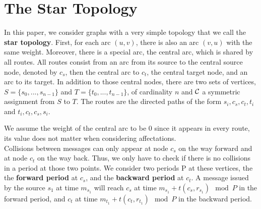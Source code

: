 \documentclass[a4paper,10pt]{article}
\begin{document}
\section{The Star Topology}
  
   
    
      In this paper, we consider graphs with a very simple topology that we call the {\bf star topology}. 
      First, for each arc $(u,v)$, there is also an arc $(v,u)$ with the same weight.
      Moreover, there is a special arc, the central arc, which is shared by all routes.
      All routes consist from an arc from its source to the central source node, denoted by {\bf $c_s$},
      then the central arc to {\bf $c_t$}, the central target node, and an arc to its target. In addition to those central nodes, there are two sets of vertices, $S=\{s_0,...,s_{n-1}\}$ and $T=\{t_0,...,t_{n-1}\}$, of cardinality $n$ and ${\cal C}$ a symmetric assignment from $S$ to $T$. 
      The routes are the directed paths of the form $s_i,c_s,c_t,t_i$ and $t_i,c_t,c_s,s_i$. 
      
      
       \begin{center}
	 

  \end{center}
	
      We assume the weight of the central arc to be $0$ since it appears in every route,
      its value does not matter when considering affectations.\\
      Collisions between messages can only appear at node $c_s$ on the way forward and at node $c_t$ on the way back.
      Thus, we only have to check if there is no collisions in a period at those two points.
      We consider two periods P at these vertices, the the {\bf forward period} at $c_s$, and the {\bf backward period} at $c_t$. A message issued by the source $s_1$ at time $m_{s_1}$ will reach $c_s$ at time $m_{s_1} + t(c_s,r_{s_1}) \mod P$ in the forward period, and  $c_t$ at time $m_{t_1} + t(c_t,r_{t_1})\mod P$ in the backward period.
\end{document}
